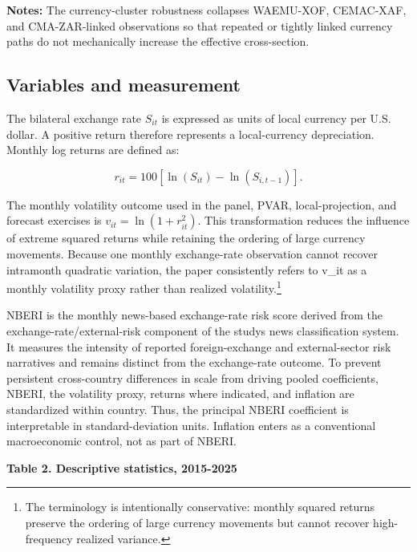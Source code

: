 \documentclass[11pt]{article}
\begin{document}
\textbf{Notes:} The currency-cluster robustness collapses WAEMU-XOF,
CEMAC-XAF, and CMA-ZAR-linked observations so that repeated or tightly
linked currency paths do not mechanically increase the effective
cross-section.

\subsection{Variables and
measurement}\label{variables-and-measurement}

The bilateral exchange rate \(S_{it}\) is expressed as units of local
currency per U.S. dollar. A positive return therefore represents a
local-currency depreciation. Monthly log returns are defined as:

\begin{equation}
r_{it}=100\left[\ln(S_{it})-\ln(S_{i,t-1})\right].
\end{equation}

The monthly volatility outcome used in the panel, PVAR,
local-projection, and forecast exercises is \(v_{it}=\ln(1+r_{it}^{2})\).
This transformation reduces the influence of extreme squared returns
while retaining the ordering of large currency movements. Because one
monthly exchange-rate observation cannot recover intramonth quadratic
variation, the paper consistently refers to v\_it as a monthly
volatility proxy rather than realized volatility.\footnote{The terminology is intentionally conservative: monthly squared returns preserve the ordering of large currency movements but cannot recover high-frequency realized variance.}

NBERI is the monthly news-based exchange-rate risk score derived from
the exchange-rate/external-risk component of the study\textquotesingle s
news classification system. It measures the intensity of reported
foreign-exchange and external-sector risk narratives and remains
distinct from the exchange-rate outcome. To prevent persistent
cross-country differences in scale from driving pooled coefficients,
NBERI, the volatility proxy, returns where indicated, and inflation are
standardized within country. Thus, the principal NBERI coefficient is
interpretable in standard-deviation units. Inflation enters as a
conventional macroeconomic control, not as part of NBERI.

\textbf{Table 2. Descriptive statistics, 2015-2025}
\end{document}

